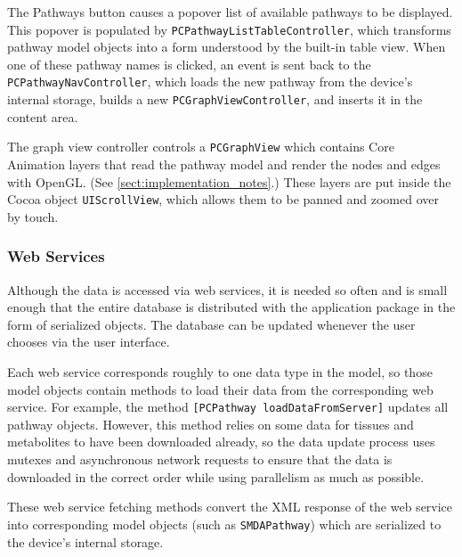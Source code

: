 The Pathways button causes a popover list of available pathways to be displayed.
This popover is populated by \texttt{PCPathwayListTableController}, which
transforms pathway model objects into a form understood by the built-in table
view. When one of these pathway names is clicked, an event is sent back to the
\texttt{PCPathwayNavController}, which loads the new pathway from the device's
internal storage, builds a new \texttt{PCGraphViewController}, and inserts it in
the content area.

The graph view controller controls a \texttt{PCGraphView} which contains Core
Animation layers that read the pathway model and render the nodes and edges with
OpenGL. (See \ref{sect:implementation_notes}.) These layers are put inside the
Cocoa object \texttt{UIScrollView}, which allows them to be panned and zoomed
over by touch.

\subsubsection{Web Services}
\label{sect:maw_web_services}

Although the data is accessed via web services, it is needed so often and is
small enough that the entire database is distributed with the application
package in the form of serialized objects. The database can be updated whenever
the user chooses via the user interface.

Each web service corresponds roughly to one data type in the model, so those
model objects contain methods to load their data from the corresponding web
service. For example, the method \texttt{[PCPathway loadDataFromServer]}
updates all pathway objects. However, this method relies on some data for
tissues and metabolites to have been downloaded already, so the data update
process uses mutexes and asynchronous network requests to ensure that the data
is downloaded in the correct order while using parallelism as much as possible.

These web service fetching methods convert the XML response of the web service
into corresponding model objects (such as \texttt{SMDAPathway}) which are
serialized to the device's internal storage.


